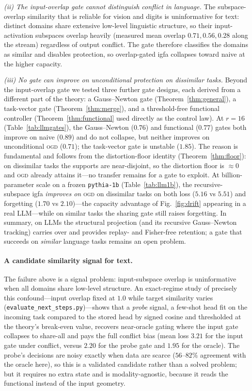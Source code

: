 \documentclass[10pt,a4paper]{article}
\theoremstyle{plain}
\theoremstyle{definition}
\newcommand{\IGFA}{igfa}
\newcommand{\OGD}{\textsc{ogd}}
\begin{document}
\emph{(ii) The input-overlap gate cannot distinguish conflict in language.} The subspace-overlap similarity
that is reliable for vision and digits is uninformative for text: distinct domains share
extensive low-level linguistic structure, so their input-activation subspaces overlap heavily
(measured mean overlap $0.71,0.56,0.28$ along the stream) regardless of output conflict. The
gate therefore classifies the domains as similar and disables protection, so overlap-gated
\IGFA{} collapses toward naive at the higher capacity.

\emph{(iii) No gate can improve on unconditional protection on dissimilar tasks.}
Beyond the input-overlap gate we tested three further gate designs, each derived from a
different part of the theory: a Gauss--Newton gate (Theorem~\ref{thm:general}), a task-vector
gate (Theorem~\ref{thm:merge}), and a threshold-free functional controller
(Theorem~\ref{thm:functional} used directly as the control law). At $r=16$
(Table~\ref{tab:llmgates}), the Gauss--Newton ($0.76$) and functional ($0.77$) gates both
improve on naive ($0.89$) and do not collapse, but neither improves on unconditional \OGD{}
($0.71$); the task-vector gate is unstable ($1.85$). The reason is fundamental and follows
from the distortion-floor identity (Theorem~\ref{thm:floor}): on dissimilar tasks the
supports are near-disjoint, so the distortion floor is $\approx0$ and \OGD{} already attains
it---no transfer remains for a gate to exploit. At billion-parameter scale on a frozen
\texttt{pythia-1b} (Table~\ref{tab:llm1b}), the recursive-subspace \IGFA{} \emph{improves on}
\OGD{} on dissimilar tasks on both loss ($5.16$ vs $5.51$) and forgetting ($1.70$ vs $2.10$)---the
capacity advantage of Fig.~\ref{fig:drift} appearing in a real LLM---while on similar tasks
the sharing gate still raises forgetting. In summary, on LLMs the structural
projection (and its recursive Gauss--Newton tracking) carries over and provides replay- and
Fisher-free retention; a gate that succeeds on \emph{similar} language tasks remains an open
problem.

\paragraph{A candidate similarity signal for text.} The failure above is a signal problem: input-subspace overlap is uninformative when all domains share
low-level structure. An exact-regime study of precisely this confound---input overlap fixed
at $1.0$ while target similarity varies (\texttt{evaluate\_next\_steps.py})---shows that a
\emph{probe} signal, a few-shot head fit on the incoming task compared to the stored head by
signed cosine and thresholded at the theory's break-even value, recovers near-oracle gating
where the input gate collapses to share-all and pays the full conflict bias (mean loss
$3.21$ for the input gate under conflict, versus $2.20$ for the probe gate and $1.95$ for
the oracle). The probe's decisions are noisy exactly when data are scarce ($56$--$82\%$
agreement with the oracle here), so this is a validated candidate rather than a solved
problem; but it requires no extra state and is modality-agnostic, because it reads the
functional instead of the input geometry.
\end{document}
